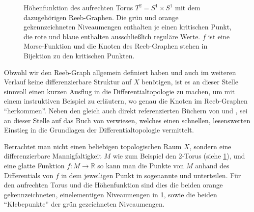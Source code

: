 \begin{figure}[tbhp]
	\caption[Höhenfunktion des aufrechten Torus mit dem dazugehörigen Reeb-Graphen]{Höhenfunktion des aufrechten Torus $T^2=S^1 \times S^1$ mit dem dazugehörigen Reeb-Graphen. Die grün und orange gekennzeichneten Niveaumengen enthalten je einen kritischen Punkt, die rote und blaue enthalten ausschließlich reguläre Werte. $f$ ist eine Morse-Funktion und die Knoten des Reeb-Graphen stehen in Bijektion zu den kritischen Punkten.}\label{fig:torus_reeb}
\end{figure}
Obwohl wir den Reeb-Graph allgemein definiert haben und auch im weiteren Verlauf keine differenzierbare Struktur auf $X$ benötigen, ist es an dieser Stelle sinnvoll einen kurzen Ausflug in die Differentialtopologie zu machen, um mit einem instruktiven Beispiel zu erläutern, wo genau die Knoten im Reeb-Graphen \enquote{herkommen}.
Neben den gleich auch direkt referenzierten Büchern von \textcite{compTopo} und \textcite{MilnorMorse}, sei an dieser Stelle auf das Buch  von \textcite{Miln} verwiesen, welches einen schnellen, lesenswerten Einstieg in die Grundlagen der Differentialtopologie vermittelt.

Betrachtet man nicht einen beliebigen topologischen Raum $X$, sondern eine differenzierbare Mannigfaltigkeit $M$ wie zum Beispiel den 2-Torus (siehe \cref{fig:torus_reeb}), und eine glatte Funktion $f \colon M \to \mathbb{R}$ so kann man die Punkte von $M$ anhand des Differentials von $f$ in dem jeweiligen Punkt in sogenannte  und  unterteilen.
Für den aufrechten Torus und die Höhenfunktion sind dies die beiden orange gekennzeichneten, einelementigen Niveaumengen in \cref{fig:torus_reeb}, sowie die beiden \enquote{Klebepunkte} der grün gezeichneten Niveaumengen.

